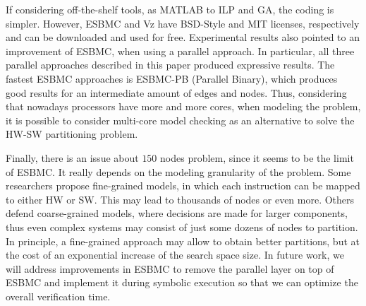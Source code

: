 
If considering off-the-shelf tools, as MATLAB to ILP and GA, the coding is simpler. However, ESBMC and Vz have BSD-Style and MIT licenses, respectively and can be downloaded and used for free. Experimental results also pointed to an improvement of ESBMC, when using a parallel approach. In particular, all three parallel approaches described in this paper produced expressive results. The fastest ESBMC approaches is ESBMC-PB (Parallel Binary), which produces good results for an intermediate amount of edges and nodes. Thus, considering that nowadays processors have more and more cores, when modeling the problem, it is possible to consider multi-core model checking as an alternative to solve the HW-SW partitioning problem. 

Finally, there is an issue about $150$ nodes problem, since it seems to be the limit of ESBMC. It really depends on the modeling granularity of the problem. Some researchers propose fine-grained models, in which each instruction can be mapped to either HW or SW. This may lead to thousands of nodes or even more. Others defend coarse-grained models, where decisions are made for larger components, thus even complex systems may consist of just some dozens of nodes to partition. In principle, a fine-grained approach may allow to obtain better partitions, but at the cost of an exponential increase of the search space size. In future work, we will address improvements in ESBMC to remove the parallel layer on top of ESBMC and implement it during symbolic execution so that we can optimize the overall verification time.


